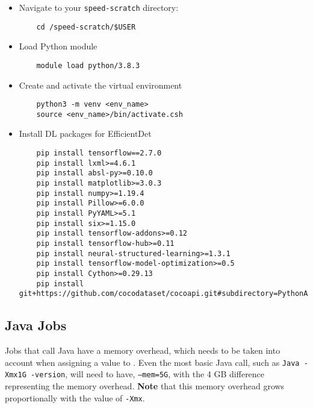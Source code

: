 \begin{itemize}
  \item Navigate to your \texttt{speed-scratch} directory:
  \begin{verbatim}
    cd /speed-scratch/$USER
  \end{verbatim}
  \item Load Python module
  \begin{verbatim}
    module load python/3.8.3
  \end{verbatim}
  \item Create and activate the virtual environment
  \begin{verbatim}
    python3 -m venv <env_name>
    source <env_name>/bin/activate.csh
  \end{verbatim}
  \item Install DL packages for EfficientDet
  \small
  \begin{verbatim}
    pip install tensorflow==2.7.0
    pip install lxml>=4.6.1
    pip install absl-py>=0.10.0
    pip install matplotlib>=3.0.3
    pip install numpy>=1.19.4
    pip install Pillow>=6.0.0
    pip install PyYAML>=5.1
    pip install six>=1.15.0
    pip install tensorflow-addons>=0.12
    pip install tensorflow-hub>=0.11
    pip install neural-structured-learning>=1.3.1
    pip install tensorflow-model-optimization>=0.5
    pip install Cython>=0.29.13
    pip install git+https://github.com/cocodataset/cocoapi.git#subdirectory=PythonAPI
    \end{verbatim}
  \normalsize
\end{itemize}

\subsection{Java Jobs}
\label{sect:java}

Jobs that call Java have a memory overhead, which needs to be taken 
into account when assigning a value to . Even the most basic 
Java call, such as \texttt{Java -Xmx1G -version}, will need to have,
\texttt{--mem=5G}, with the 4 GB difference representing the memory overhead. 
\textbf{Note} that this memory overhead grows proportionally with the value of
\texttt{-Xmx}.

